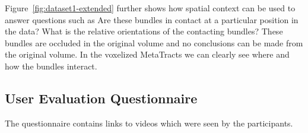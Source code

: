 Figure~\ref{fig:dataset1-extended} further shows how spatial context can be used to answer questions such as  Are these bundles in contact at a particular position in the data? What is the relative orientations of the contacting bundles? These bundles are occluded in the original volume and no conclusions can be made from the original volume. In the voxelized MetaTracts we can clearly see where and how the bundles interact.






\subsection{User Evaluation Questionnaire}
The questionnaire contains links to videos which were seen by the participants.
\label{subsec:usereval}
\pagebreak


